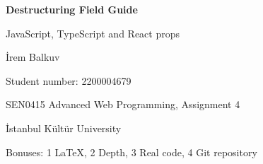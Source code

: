 \documentclass[11pt,a4paper]{article}
\begin{document}
\begin{titlepage}
  \centering
  \vspace*{5cm}
  {\sffamily\Huge\bfseries Destructuring Field Guide\par}
  \vspace{0.6cm}
  {\sffamily\Large JavaScript, TypeScript and React props\par}
  \vspace{2.5cm}
  {\large İrem Balkuv\par}
  {\large Student number: 2200004679\par}
  \vspace{1cm}
  {SEN0415 Advanced Web Programming, Assignment 4\par}
  {İstanbul Kültür University\par}
  \vfill
  {\small Bonuses: 1 LaTeX, 2 Depth, 3 Real code, 4 Git repository\par}
\end{titlepage}

\tableofcontents
\newpage


\end{document}

